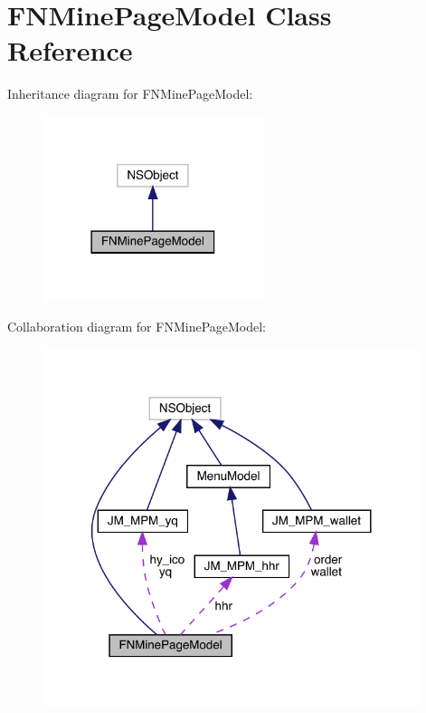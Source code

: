 \hypertarget{interface_f_n_mine_page_model}{}\section{F\+N\+Mine\+Page\+Model Class Reference}
\label{interface_f_n_mine_page_model}


Inheritance diagram for F\+N\+Mine\+Page\+Model\+:\nopagebreak
\begin{figure}[H]
\begin{center}
\leavevmode
\includegraphics[width=182pt]{interface_f_n_mine_page_model__inherit__graph}
\end{center}
\end{figure}


Collaboration diagram for F\+N\+Mine\+Page\+Model\+:\nopagebreak
\begin{figure}[H]
\begin{center}
\leavevmode
\includegraphics[width=311pt]{interface_f_n_mine_page_model__coll__graph}
\end{center}
\end{figure}
